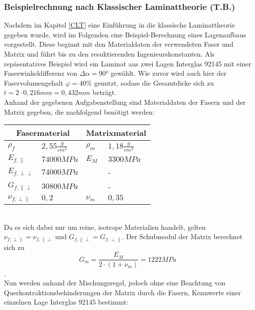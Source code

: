 \subsubsection{Beispielrechnung nach Klassischer Laminattheorie (T.B.)}
Nachdem im Kapitel \ref{CLT} eine Einführung in die klassische Laminattheorie gegeben wurde, wird im Folgenden eine Beispiel-Berechnung eines Lagenaufbaus vorgestellt. Diese beginnt mit den Materialdaten der verwendeten Faser und Matrix und führt bis zu den resuktierenden Ingenieurskonstanten. Als repäsentatives Beispiel wird ein Laminat aus zwei Lagen Interglas 92145 mit einer Faserwinkeldifferenz von $\Delta\alpha =90°$ gewählt. Wie zuvor wird auch hier der Faservolumengehalt $\varphi = 40\%$ genutzt, sodass die Gesamtdicke sich zu $t= 2\cdot 0,216mm=0,432mm$ beträgt. \\

\noindent Anhand der gegebenen Aufgabenstellung sind Materialdaten der Fasern und der Matrix gegeben, die nachfolgend benötigt werden:\\

\begin{tabular}{ll|ll}
	\multicolumn{2}{c}{Fasermaterial} &\multicolumn{2}{c}{Matrixmaterial}\\
	\hline
	$\rho_{f}$ & $2,55 \frac{g}{cm^{3}}$  & $\rho_{m}$ & $1,18 \frac{g}{cm^{3}}$\\
	\hline
	$E_{f,\parallel}$ & $74000MPa$  & $E_{M}$ & $3300MPa$\\
	\hline
	$E_{f,\perp\perp}$ & $74000MPa$  &  & - \\
	\hline
	$G_{f,\parallel\perp}$ & $30800MPa$ &  & - \\
	\hline
	$\nu_{f,\perp\parallel}$ & $0,2$  &$\nu_{m}$ &  $0,35$\\
\end{tabular}\\

\noindent Da es sich dabei nur um reine, isotrope Materialien handelt, gelten $\nu_{f,\perp\parallel} = \nu_{f,\parallel\perp}$ und $G_{f,\parallel\perp} = G_{f,\perp\parallel}$. Der Schubmodul der Matrix berechnet sich zu
\begin{equation}
 	G_{m}=\frac{E_{M}}{2\cdot (1+\nu_{m})}=1222MPa
\end{equation}.\\

\noindent Nun werden anhand der Mischungsregel, jedoch ohne eine Beachtung von Querkontraktionsbehinderungen der Matrix durch die Fasern, Kennwerte einer einzelnen Lage Interglas 92145 bestimmt:

